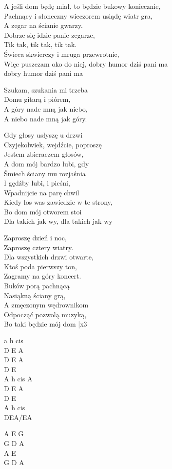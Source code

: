 
\begin{text}
    A jeśli dom będę miał, to będzie bukowy koniecznie,\\
    Pachnący i słoneczny wieczorem usiądę wiatr gra,\\
    A zegar na ścianie gwarzy.\\
    Dobrze się idzie panie zegarze,\\
    Tik tak, tik tak, tik tak.\\
    Świeca skwierczy i mruga przewrotnie,\\
    Więc puszczam oko do niej, dobry humor dziś pani ma\\
    dobry humor dziś pani ma

    \vin Szukam, szukania mi trzeba\\
    \vin Domu gitarą i piórem,\\
    \vin A góry nade mną jak niebo,\\
    \vin A niebo nade mną jak góry.

    Gdy głosy usłyszę u drzwi\\
    Czyjekolwiek, wejdźcie, poproszę\\
    Jestem zbieraczem głosów,\\
    A dom mój bardzo lubi, gdy\\
    Śmiech ściany mu rozjaśnia\\
    I gędźby lubi, i pieśni,\\
    Wpadnijcie na parę chwil\\
    Kiedy los was zawiedzie w te strony,\\
    Bo dom mój otworem stoi\\
    Dla takich jak wy, dla takich jak wy

    Zaproszę dzień i noc,\\
    Zaproszę cztery wiatry.\\
    Dla wszystkich drzwi otwarte,\\
    Ktoś poda pierwszy ton,\\
    Zagramy na góry koncert.\\
    Buków porą pachnącą\\
    Nasiąkną ściany grą,\\
    A zmęczonym wędrownikom\\
    Odpocząć pozwolą muzyką,\\
    Bo taki będzie mój dom |x3
\end{text}
\begin{chord}
    a h cis\\
    D E A\\
    D E A\\
    D E\\
    A h cis A\\
    D E A\\
    D E\\
    A h cis\\
    DEA/EA

    A E G\\
    G D A\\
    A E\\
    G D A
\end{chord}